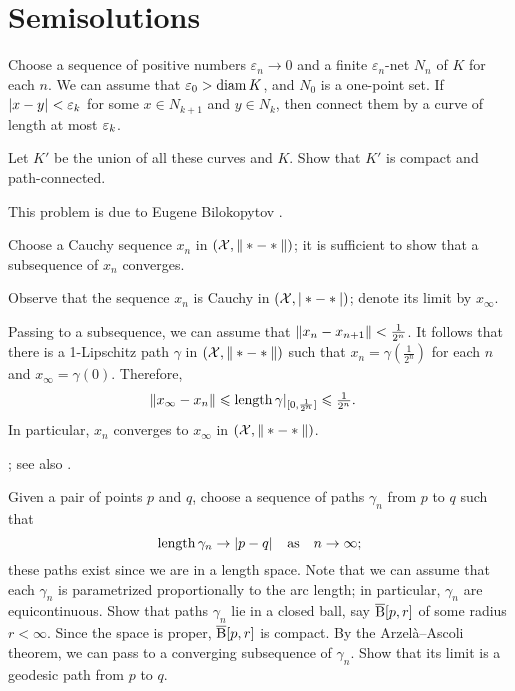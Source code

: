 \chapter{Semisolutions}

Choose a sequence of positive numbers $\varepsilon_n\to 0$ and a finite $\varepsilon_n$-net $N_n$ of $K$ for each $n$.
We can assume that $\varepsilon_0>\operatorname{\rm diam}\nolimits K$, and $N_0$ is a one-point set.
If $|{x}-{y}|_{}^{{}}<\varepsilon_k$ for some $x\in N_{k+1}$ and $y\in N_{k}$, then connect them by a curve of length at most $\varepsilon_k$.

Let $K'$ be the union of all these curves and $K$.
Show that $K'$ is compact and path-connected.

 This problem is due to Eugene Bilokopytov \cite{bilokopytov}.

Choose a Cauchy sequence $x_n$ in $(\mathcal{X},\|*-*\|)$; it is sufficient to show that a subsequence of $x_n$ converges.

Observe that the sequence $x_n$ is Cauchy in $(\mathcal{X},|*-*|)$;
denote its limit by $x_\infty$.

Passing to a subsequence, we can assume that $\|x_n-x_{n+1}\|<\tfrac1{2^n}$.
It follows that there is a 1-Lipschitz path $\gamma$ in $(\mathcal{X},\|*-*\|)$ such that $x_n=\gamma(\tfrac1{2^n})$ for each $n$ and $x_\infty=\gamma(0)$.
Therefore,
\begin{align*}
\|x_\infty-x_n\|&\leqslant \mathop{\rm length}\nolimits\gamma|_{[0,\frac1{2^n}]}\leqslant \tfrac1{2^n}.
\end{align*}
In particular, $x_n$ converges to $x_\infty$ in $(\mathcal{X},\|*-*\|)$.

 \cite[Corollary]{hu-kirk}; see also \cite[Lemma 2.3]{petrunin-stadler}.

Given a pair of points $p$ and $q$, choose a sequence of paths $\gamma_n$ from $p$ to $q$ such that
\[\mathop{\rm length}\nolimits\gamma_n\to |{p}-{q}|_{}^{{}}
\quad\text{as}\quad
n\to\infty;\]
these paths exist since we are in a length space.
Note that we can assume that each $\gamma_n$ is parametrized proportionally to the arc length;
in particular, $\gamma_n$ are equicontinuous.
Show that paths $\gamma_n$ lie in a closed ball, say $\overline{\mathrm{B}}{}[p,r]$ of some radius $r<\infty$.
Since the space is proper, $\overline{\mathrm{B}}{}[p,r]$ is compact.
By the Arzelà--Ascoli theorem, we can pass to a converging subsequence of $\gamma_n$.
Show that its limit is a geodesic path from $p$ to $q$.

